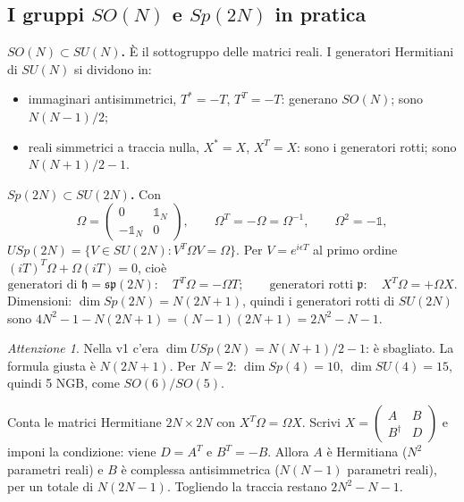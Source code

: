 \documentclass[11pt,a4paper]{article}
\numberwithin{equation}{section}
\theoremstyle{remark}
\newtheorem*{attenzione}{Attenzione}
\newcommand{\p}{\mathfrak{p}}
\newcommand{\h}{\mathfrak{h}}
\newcommand{\one}{\mathbb{1}}
\begin{document}
\subsection{I gruppi $SO(N)$ e $Sp(2N)$ in pratica}

\textbf{$SO(N)\subset SU(N)$.} È il sottogruppo delle matrici reali. I generatori Hermitiani di $SU(N)$ si dividono in:
\begin{itemize}[nosep]
\item immaginari antisimmetrici, $T^*=-T$, $T^T=-T$: generano $SO(N)$; sono $N(N-1)/2$;
\item reali simmetrici a traccia nulla, $X^*=X$, $X^T=X$: sono i generatori rotti; sono $N(N+1)/2-1$.
\end{itemize}

\textbf{$Sp(2N)\subset SU(2N)$.} Con
\[
\Omega=\begin{pmatrix}0&\one_N\\-\one_N&0\end{pmatrix},\qquad \Omega^T=-\Omega=\Omega^{-1},\qquad \Omega^2=-\one,
\]
$USp(2N)=\{V\in SU(2N):V^T\Omega V=\Omega\}$. Per $V=e^{i\epsilon T}$ al primo ordine $(iT)^T\Omega+\Omega(iT)=0$, cioè
\begin{equation}
\text{generatori di } \h=\mathfrak{sp}(2N):\quad T^T\Omega=-\Omega T;\qquad \text{generatori rotti } \p:\quad X^T\Omega=+\Omega X .
\label{eq:spcond}
\end{equation}
Dimensioni: $\dim Sp(2N)=N(2N+1)$, quindi i generatori rotti di $SU(2N)$ sono $4N^2-1-N(2N+1)=(N-1)(2N+1)=2N^2-N-1$.

\begin{attenzione}
Nella v1 c'era $\dim USp(2N)=N(N+1)/2-1$: è sbagliato. La formula giusta è $N(2N+1)$. Per $N=2$: $\dim Sp(4)=10$, $\dim SU(4)=15$, quindi 5 NGB, come $SO(6)/SO(5)$.
\end{attenzione}

\begin{verifica}
Conta le matrici Hermitiane $2N\times2N$ con $X^T\Omega=\Omega X$. Scrivi $X=\begin{pmatrix}A&B\\B^\dagger&D\end{pmatrix}$ e imponi la condizione: viene $D=A^T$ e $B^T=-B$. Allora $A$ è Hermitiana ($N^2$ parametri reali) e $B$ è complessa antisimmetrica ($N(N-1)$ parametri reali), per un totale di $N(2N-1)$. Togliendo la traccia restano $2N^2-N-1$. \checkmark
\end{verifica}

\end{document}
